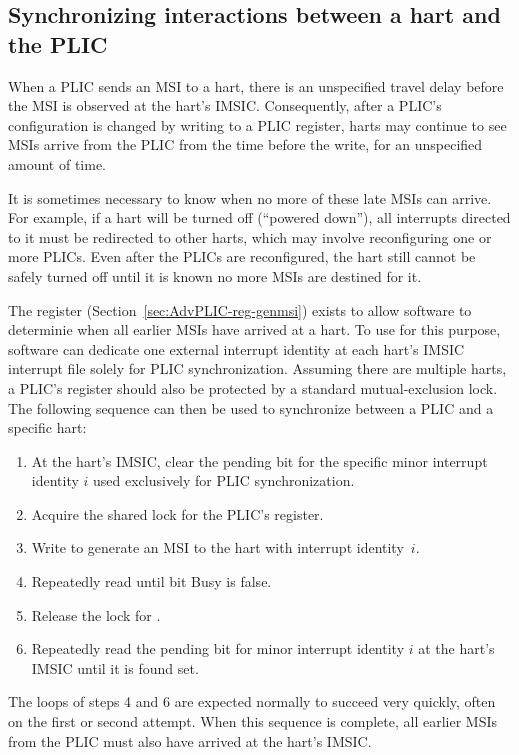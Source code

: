 \subsection{Synchronizing interactions between a hart and the PLIC}
\label{sec:AdvPLIC-MSISync}

When a PLIC sends an MSI to a hart, there is an unspecified travel
delay before the MSI is observed at the hart's IMSIC.
Consequently, after a PLIC's configuration is changed by writing to a
PLIC register, harts may continue to see MSIs arrive from the PLIC from
the time before the write, for an unspecified amount of time.

It is sometimes necessary to know when no more of these late MSIs can
arrive.
For example, if a hart will be turned off (``powered down''), all
interrupts directed to it must be redirected to other harts, which may
involve reconfiguring one or more PLICs.
Even after the PLICs are reconfigured, the hart still cannot be safely
turned off until it is known no more MSIs are destined for it.

The  register (Section~\ref{sec:AdvPLIC-reg-genmsi}) exists
to allow software to determinie when all earlier MSIs have arrived at a
hart.
To use  for this purpose, software can dedicate one external
interrupt identity at each hart's IMSIC interrupt file solely for PLIC
synchronization.
Assuming there are multiple harts, a PLIC's  register should
also be protected by a standard mutual-exclusion lock.
The following sequence can then be used to synchronize between a PLIC
and a specific hart:
\begin{enumerate}

\item
At the hart's IMSIC, clear the pending bit for the specific minor
interrupt identity $i$ used exclusively for PLIC synchronization.

\item
Acquire the shared lock for the PLIC's  register.

\item
Write  to generate an MSI to the hart with interrupt
identity~$i$.

\item
Repeatedly read  until bit Busy is false.

\item
Release the lock for .

\item
Repeatedly read the pending bit for minor interrupt identity $i$ at the
hart's IMSIC until it is found set.

\end{enumerate}
The loops of steps 4 and 6 are expected normally to succeed very
quickly, often on the first or second attempt.
When this sequence is complete, all earlier MSIs from the PLIC must
also have arrived at the hart's IMSIC.

